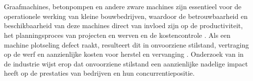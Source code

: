 
\chapter{}%
\label{ch:inleiding}



\section{}%
\label{sec:context}

Graafmachines, betonpompen en andere zware machines zijn essentieel voor de operationele werking van kleine bouwbedrijven, waardoor de betrouwbaarheid en beschikbaarheid van deze machines direct van invloed zijn op de productiviteit, het planningsproces van projecten en werven en de kostencontrole \autocite{Mikulic2024}. Als een machine plotseling defect raakt, resulteert dit in onvoorziene stilstand, vertraging op de werf en aanzienlijke kosten voor herstel en vervanging \autocite{ErRatby2025}. Onderzoek van \textcite{Mahfoud2025} in de industrie wijst erop dat onvoorziene stilstand een aanzienlijke nadelige impact heeft op de prestaties van bedrijven en hun concurrentiepositie.

